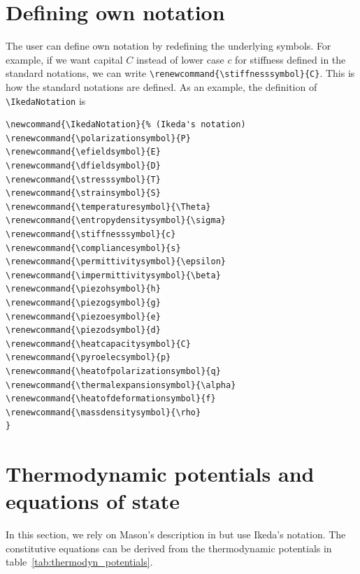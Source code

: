 \documentclass[a4paper, 12pt]{article}
\begin{document}
\section{Defining own notation}
The user can define own notation by redefining the underlying symbols.
For example, if we want capital $C$ instead of lower case $c$ for stiffness defined in the standard notations,
we can write \verb|\renewcommand{\stiffnesssymbol}{C}|. This is how the standard notations are defined. As an example, the definition of \verb|\IkedaNotation| is
\begin{verbatim}
\newcommand{\IkedaNotation}{% (Ikeda's notation)
\renewcommand{\polarizationsymbol}{P}
\renewcommand{\efieldsymbol}{E}
\renewcommand{\dfieldsymbol}{D}
\renewcommand{\stresssymbol}{T}
\renewcommand{\strainsymbol}{S}
\renewcommand{\temperaturesymbol}{\Theta}
\renewcommand{\entropydensitysymbol}{\sigma}
\renewcommand{\stiffnesssymbol}{c}
\renewcommand{\compliancesymbol}{s}
\renewcommand{\permittivitysymbol}{\epsilon}
\renewcommand{\impermittivitysymbol}{\beta}
\renewcommand{\piezohsymbol}{h}
\renewcommand{\piezogsymbol}{g}
\renewcommand{\piezoesymbol}{e}
\renewcommand{\piezodsymbol}{d}
\renewcommand{\heatcapacitysymbol}{C}
\renewcommand{\pyroelecsymbol}{p}
\renewcommand{\heatofpolarizationsymbol}{q}
\renewcommand{\thermalexpansionsymbol}{\alpha}
\renewcommand{\heatofdeformationsymbol}{f}
\renewcommand{\massdensitysymbol}{\rho}
}
\end{verbatim}

\appendix
\section{Thermodynamic potentials and equations of state}
In this section, we rely on Mason's description in \cite{Mason1958} but use Ikeda's  notation. The constitutive equations can be derived from the thermodynamic potentials in table~\ref{tab:thermodyn_potentials}.
\end{document}
